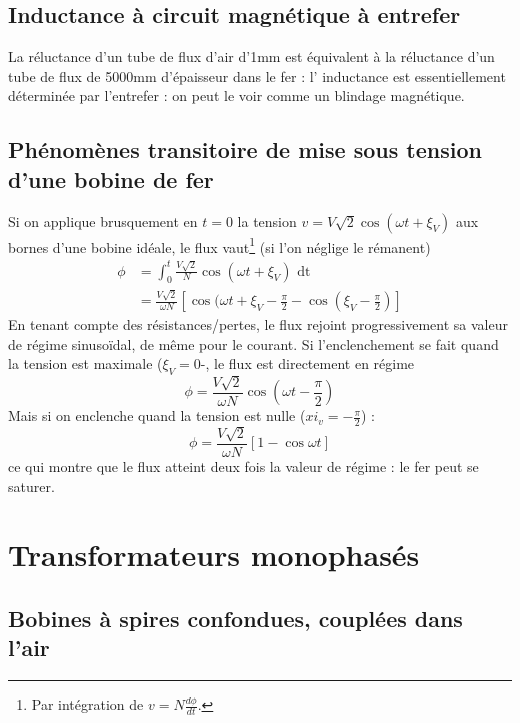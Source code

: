 	\subsection{Inductance à circuit magnétique à entrefer}
	La réluctance d'un tube de flux d'air d'1mm est équivalent à la 
	réluctance d'un tube de flux de 5000mm d'épaisseur dans le fer : l'
	inductance est essentiellement déterminée par l'entrefer : on peut le 
	voir comme un blindage magnétique.
	
	\subsection{Phénomènes transitoire de mise sous tension d'une bobine 
	de fer}
	Si on applique brusquement en $t=0$ la tension $v=V\sqrt{2}\cos(\omega 
	t+\xi_V)$ aux bornes d'une bobine idéale, le flux vaut\footnote{Par 
	intégration de $v = N\frac{d\phi}{dt}$.} (si l'on néglige le rémanent)
	\begin{equation}
	\begin{array}{ll}
	\phi &= \int_0^t \frac{V\sqrt{2}}{N}\cos(\omega t + \xi_V)\text{ dt}\\
	 &= \frac{V\sqrt{2}}{\omega N}\left[\cos(\omega t + \xi_V - \frac{\pi}{2}
	 -\cos(\xi_V-\frac{\pi}{2})\right]
	\end{array}	
	\end{equation}
	En tenant compte des résistances/pertes, le flux rejoint progressivement 
	sa valeur de régime sinusoïdal, de même pour le courant. Si l'enclenchement 
	se fait quand la tension est maximale ($\xi_V=0$-, le flux est directement 
	en régime
	\begin{equation}
	\phi = \frac{V\sqrt{2}}{\omega N}\cos\left(\omega t - \frac{\pi}{2}\right)
	\end{equation}	
	Mais si on enclenche quand la tension est nulle ($xi_v = -\frac{\pi}{2}$) :
	\begin{equation}
	\phi = \frac{V\sqrt{2}}{\omega N}[1-\cos\omega t]
	\end{equation}
	ce qui montre que le flux atteint deux fois la valeur de régime : le fer 
	peut se saturer.
		
\section{Transformateurs monophasés}
	\subsection{Bobines à spires confondues, couplées dans l'air}
		
		
		
		
		
		
		
		
		